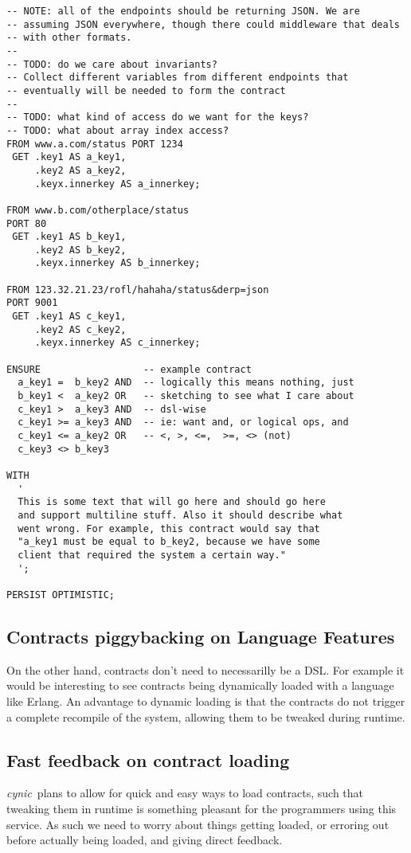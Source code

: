 \documentclass[12pt,twoside]{article}
\newcommand{\projectname}[0]{\textit{cynic}}
\begin{document}
\begin{lstlisting}[language=nouscontract,caption='Sample Contract']
-- NOTE: all of the endpoints should be returning JSON. We are
-- assuming JSON everywhere, though there could middleware that deals
-- with other formats.
--
-- TODO: do we care about invariants?
-- Collect different variables from different endpoints that
-- eventually will be needed to form the contract
--
-- TODO: what kind of access do we want for the keys?
-- TODO: what about array index access?
FROM www.a.com/status PORT 1234
 GET .key1 AS a_key1,
     .key2 AS a_key2,
     .keyx.innerkey AS a_innerkey;

FROM www.b.com/otherplace/status
PORT 80
 GET .key1 AS b_key1,
     .key2 AS b_key2,
     .keyx.innerkey AS b_innerkey;

FROM 123.32.21.23/rofl/hahaha/status&derp=json
PORT 9001
 GET .key1 AS c_key1,
     .key2 AS c_key2,
     .keyx.innerkey AS c_innerkey;

ENSURE                  -- example contract
  a_key1 =  b_key2 AND  -- logically this means nothing, just
  b_key1 <  a_key2 OR   -- sketching to see what I care about
  c_key1 >  a_key3 AND  -- dsl-wise
  c_key1 >= a_key3 AND  -- ie: want and, or logical ops, and
  c_key1 <= a_key2 OR   -- <, >, <=,  >=, <> (not)
  c_key3 <> b_key3

WITH
  '
  This is some text that will go here and should go here
  and support multiline stuff. Also it should describe what
  went wrong. For example, this contract would say that
  "a_key1 must be equal to b_key2, because we have some
  client that required the system a certain way."
  ';

PERSIST OPTIMISTIC;
\end{lstlisting}

\subsection{Contracts piggybacking on Language Features}
On the other hand, contracts don't need to necessarilly be a DSL. For
example it would be interesting to see contracts being dynamically
loaded with a language like Erlang. An advantage to dynamic loading is
that the contracts do not trigger a complete recompile of the system,
allowing them to be tweaked during runtime.

\subsection{Fast feedback on contract loading}
\projectname \ plans to allow for quick and easy ways to load contracts,
such that tweaking them in runtime is something pleasant for the
programmers using this service. As such we need to worry about things
getting loaded, or erroring out before actually being loaded, and
giving direct feedback.
\end{document}
